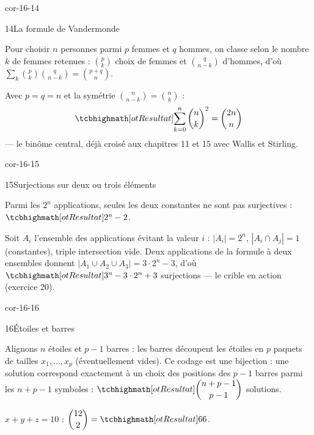 \begin{blocLivre}{cor-16-14}
\begin{corrige}{14}{La formule de Vandermonde}
\begin{questions}
  \item Pour choisir $n$ personnes parmi $p$ femmes et $q$ hommes, on
    classe selon le nombre $k$ de femmes retenues :
    $\binom pk$ choix de femmes et $\binom q{n-k}$ d'hommes, d'où
    $\displaystyle\sum_{k}\binom pk\binom q{n-k}=\binom{p+q}{n}$.
  \item Avec $p=q=n$ et la symétrie $\binom n{n-k}=\binom nk$ :
    \[
    \res{\sum_{k=0}^{n}\binom nk^{2}=\binom{2n}{n}}
    \]
    — le binôme central, déjà croisé aux chapitres 11 et 15 avec Wallis
    et Stirling.
\end{questions}
\end{corrige}
\end{blocLivre}

\begin{blocLivre}{cor-16-15}
\begin{corrige}{15}{Surjections sur deux ou trois éléments}
\begin{questions}
  \item Parmi les $2^{n}$ applications, seules les deux constantes ne
    sont pas surjectives : $\res{2^{n}-2}$.
  \item Soit $A_i$ l'ensemble des applications évitant la valeur $i$ :
    $|A_i|=2^{n}$, $|A_i\cap A_j|=1$ (constantes), triple intersection
    vide. Deux applications de la formule à deux ensembles donnent
    $|A_1\cup A_2\cup A_3|=3\cdot2^{n}-3$, d'où
    $\res{3^{n}-3\cdot2^{n}+3}$ surjections — le crible en action
    (exercice 20).
\end{questions}
\end{corrige}
\end{blocLivre}

\begin{blocLivre}{cor-16-16}
\begin{corrige}{16}{Étoiles et barres}
\begin{questions}
  \item Alignons $n$ étoiles et $p-1$ barres : les barres découpent les
    étoiles en $p$ paquets de tailles $x_1,\dots,x_p$ (éventuellement
    vides). Ce codage est une bijection : une solution correspond
    exactement à un choix des positions des $p-1$ barres parmi les
    $n+p-1$ symboles :
    $\res{\dbinom{n+p-1}{p-1}}$ solutions.
  \item $x+y+z=10$ : $\dbinom{12}2=\res{66}$.
\end{questions}
\end{corrige}
\end{blocLivre}


